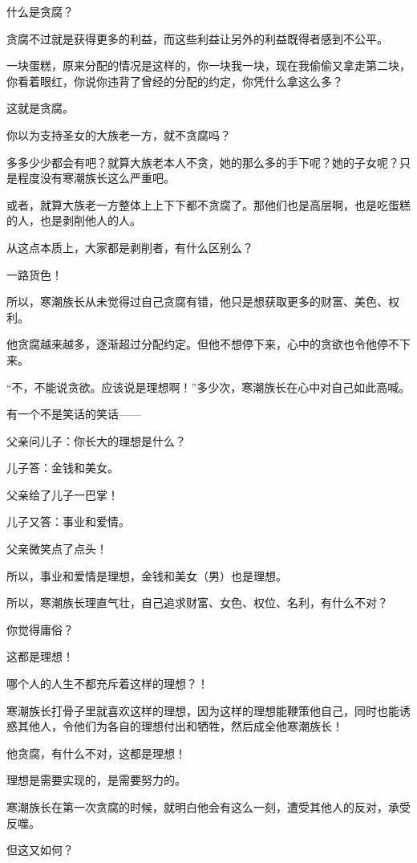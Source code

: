 \begin{this_body}
什么是贪腐？

贪腐不过就是获得更多的利益，而这些利益让另外的利益既得者感到不公平。

一块蛋糕，原来分配的情况是这样的，你一块我一块，现在我偷偷又拿走第二块，你看着眼红，你说你违背了曾经的分配的约定，你凭什么拿这么多？

这就是贪腐。

你以为支持圣女的大族老一方，就不贪腐吗？

多多少少都会有吧？就算大族老本人不贪，她的那么多的手下呢？她的子女呢？只是程度没有寒潮族长这么严重吧。

或者，就算大族老一方整体上上下下都不贪腐了。那他们也是高层啊，也是吃蛋糕的人，也是剥削他人的人。

从这点本质上，大家都是剥削者，有什么区别么？

一路货色！

所以，寒潮族长从未觉得过自己贪腐有错，他只是想获取更多的财富、美色、权利。

他贪腐越来越多，逐渐超过分配约定。但他不想停下来，心中的贪欲也令他停不下来。

“不，不能说贪欲。应该说是理想啊！”多少次，寒潮族长在心中对自己如此高喊。

有一个不是笑话的笑话——

父亲问儿子：你长大的理想是什么？

儿子答：金钱和美女。

父亲给了儿子一巴掌！

儿子又答：事业和爱情。

父亲微笑点了点头！

所以，事业和爱情是理想，金钱和美女（男）也是理想。

所以，寒潮族长理直气壮，自己追求财富、女色、权位、名利，有什么不对？

你觉得庸俗？

这都是理想！

哪个人的人生不都充斥着这样的理想？！

寒潮族长打骨子里就喜欢这样的理想，因为这样的理想能鞭策他自己，同时也能诱惑其他人，令他们为各自的理想付出和牺牲，然后成全他寒潮族长！

他贪腐，有什么不对，这都是理想！

理想是需要实现的，是需要努力的。

寒潮族长在第一次贪腐的时候，就明白他会有这么一刻，遭受其他人的反对，承受反噬。

但这又如何？


\end{this_body}
